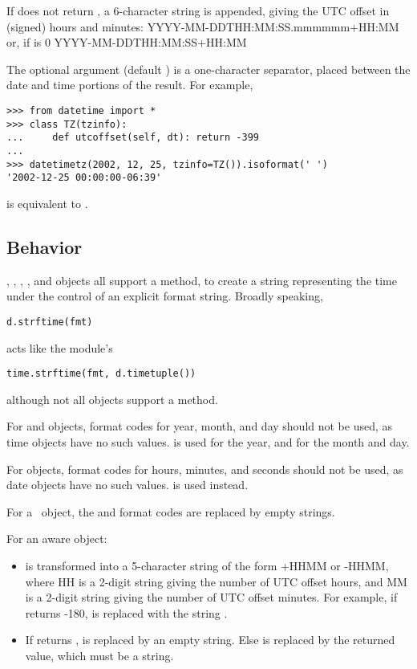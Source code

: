     If  does not return , a 6-character
    string is appended, giving the UTC offset in (signed) hours and
    minutes:
        YYYY-MM-DDTHH:MM:SS.mmmmmm+HH:MM
    or, if  is 0
        YYYY-MM-DDTHH:MM:SS+HH:MM

    The optional argument  (default ) is a
    one-character separator, placed between the date and time portions
    of the result.  For example,

\begin{verbatim}
>>> from datetime import *
>>> class TZ(tzinfo):
...     def utcoffset(self, dt): return -399
...
>>> datetimetz(2002, 12, 25, tzinfo=TZ()).isoformat(' ')
'2002-12-25 00:00:00-06:39'
\end{verbatim}

 is equivalent to .


\subsection{ Behavior}

, , , ,
and  objects all support a 
method, to create a string representing the time under the control of
an explicit format string.  Broadly speaking,
\begin{verbatim}
d.strftime(fmt)
\end{verbatim}
acts like the  module's
\begin{verbatim}
time.strftime(fmt, d.timetuple())
\end{verbatim}
although not all objects support a  method.

For  and  objects, format codes for year,
month, and day should not be used, as time objects have no such values.
 is used for the year, and  for the month and day.

For  objects, format codes for hours, minutes, and seconds
should not be used, as date objects have no such values.   is
used instead.

For a \naive\ object, the  and  format codes are
replaced by empty strings.

For an aware object:

\begin{itemize}
  \item[\code{\%z}]
     is transformed into a 5-character string of
    the form +HHMM or -HHMM, where HH is a 2-digit string giving the
    number of UTC offset hours, and MM is a 2-digit string giving the
    number of UTC offset minutes.  For example, if
     returns -180,  is replaced with the
    string .

  \item[\code{\%Z}]
    If  returns ,  is replaced
    by an empty string.  Else  is replaced by the returned
    value, which must be a string.
\end{itemize}

